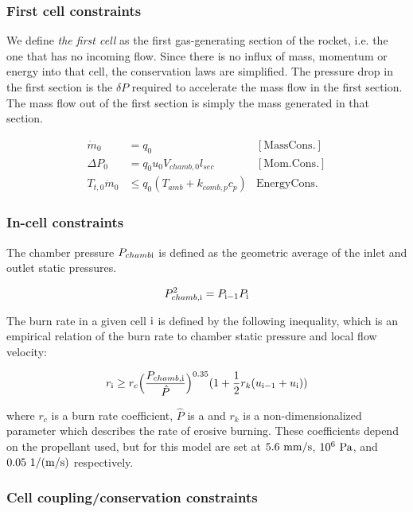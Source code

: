 \subsubsection{First cell constraints}

We define \textit{the first cell} as the first gas-generating section
of the rocket, i.e. the one that has no incoming flow.
Since there is no influx of mass, momentum or energy into that cell,
the conservation laws are simplified.
The pressure drop in the first section is the $\delta P$ required
to accelerate the mass flow in the first section. The mass flow out of
the first section is simply the mass generated in that section.

\begin{align}
    \dot{m}_0 &= q_0 &\mathrm{[Mass Cons.]} \\
    \Delta P_0 &= q_0 u_0 V_{chamb,0} l_{sec} &\mathrm{[Mom. Cons.]}\\
    T_{t, 0} \dot{m}_0 &\leq q_0 (T_{amb} + k_{comb,p} c_{p}) &\mathrm{Energy Cons.}
\end{align}

\subsubsection{In-cell constraints}

The chamber pressure $P_{chamb \rm{i}}$ is defined as the geometric average of
the inlet and outlet static pressures.

\begin{equation}
    P_{chamb, \rm{i}}^2 = P_{\rm{i}-1} P_{\rm{i}}
\end{equation}

The burn rate in a given cell $\rm{i}$ is defined by the following inequality,
which is an empirical relation of the burn rate to chamber static
pressure and local flow velocity:

\begin{equation}
r_{\rm{i}} \geq r_c  \Big(\frac{P_{chamb,\rm{i}}}{\hat{P}}\Big)^{0.35} (1 + \frac{1}{2} r_k (u_{\rm{i}-1} + u_{\rm{i}}))
\end{equation}

where $r_c$ is a burn rate coefficient, $\hat{P}$ is a and $r_k$ is a non-dimensionalized parameter
which describes the rate of erosive burning. These coefficients
depend on the propellant used, but for this model are set at
$5.6~\rm{mm/s}$, $10^{6}~\rm{Pa}$, and $0.05~\rm{1/(m/s)}$ respectively.

\subsubsection{Cell coupling/conservation constraints}

